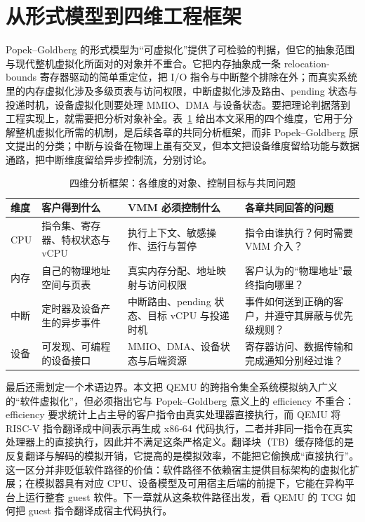\section{从形式模型到四维工程框架}\label{sec:intro-dims}

Popek--Goldberg 的形式模型为“可虚拟化”提供了可检验的判据，但它的抽象范围与现代整机虚拟化所面对的对象并不重合。它把内存抽象成一条 relocation-bounds 寄存器驱动的简单重定位，把 I/O 指令与中断整个排除在外；而真实系统里的内存虚拟化涉及多级页表与访问权限，中断虚拟化涉及路由、pending 状态与投递时机，设备虚拟化则要处理 MMIO、DMA 与设备状态。要把理论判据落到工程实现上，就需要把分析对象补全。表~\ref{tab:fourdim} 给出本文采用的四个维度，它用于分解整机虚拟化所需的机制，是后续各章的共同分析框架，而非 Popek--Goldberg 原文提出的分类；中断与设备在物理上虽有交叉，但本文把设备维度留给功能与数据通路，把中断维度留给异步控制流，分别讨论。

\begin{table}[htbp]
\centering
\caption{四维分析框架：各维度的对象、控制目标与共同问题}
\label{tab:fourdim}
\begin{tabularx}{\linewidth}{@{}l>{\raggedright\arraybackslash}X>{\raggedright\arraybackslash}X>{\raggedright\arraybackslash}X@{}}
\toprule
维度 & 客户得到什么 & VMM 必须控制什么 & 各章共同回答的问题 \\
\midrule
CPU & 指令集、寄存器、特权状态与 vCPU & 执行上下文、敏感操作、运行与暂停 & 指令由谁执行？何时需要 VMM 介入？ \\
内存 & 自己的物理地址空间与页表 & 真实内存分配、地址映射与访问权限 & 客户认为的“物理地址”最终指向哪里？ \\
中断 & 定时器及设备产生的异步事件 & 中断路由、pending 状态、目标 vCPU 与投递时机 & 事件如何送到正确的客户，并遵守其屏蔽与优先级规则？ \\
设备 & 可发现、可编程的设备接口 & MMIO、DMA、设备状态与后端资源 & 寄存器访问、数据传输和完成通知分别经过谁？ \\
\bottomrule
\end{tabularx}
\end{table}

最后还需划定一个术语边界。本文把 QEMU 的跨指令集全系统模拟纳入广义的“软件虚拟化”，但必须指出它与 Popek--Goldberg 意义上的 efficiency 不重合：efficiency 要求统计上占主导的客户指令由真实处理器直接执行，而 QEMU 将 RISC-V 指令翻译成中间表示再生成 x86-64 代码执行，二者并非同一指令在真实处理器上的直接执行，因此并不满足这条严格定义\cite{source1,source3}。翻译块（TB）缓存降低的是反复翻译与解码的模拟开销，它提高的是模拟效率，不能把它偷换成“直接执行”。这一区分并非贬低软件路径的价值：软件路径不依赖宿主提供目标架构的虚拟化扩展；在模拟器具有对应 CPU、设备模型及可用宿主后端的前提下，它能在异构平台上运行整套 guest 软件。下一章就从这条软件路径出发，看 QEMU 的 TCG 如何把 guest 指令翻译成宿主代码执行。
